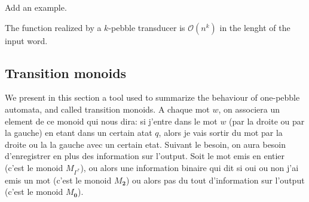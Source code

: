 \begin{example}
\begin{center}
Add an example.
\end{center}
\end{example}



\begin{proposition}
The function realized by a $k$-pebble transducer is $\mathcal{O}(n^k)$ in the lenght of the input word.
\end{proposition}

\subsection{Transition monoids}
We present in this section a tool used to summarize the behaviour of one-pebble automata, and called transition monoids. A chaque mot $w$, on associera un element de ce monoid qui nous dira: si j'entre dans le mot $w$ (par la droite ou par la gauche) en etant dans un certain atat $q$, alors je vais sortir du mot par la droite ou la  la gauche avec un certain etat. Suivant le besoin, on aura besoin d'enregistrer en plus des information sur l'output. Soit le mot emis en entier (c'est le monoid $M_{\Gamma^*}$), ou alors une information binaire qui dit si oui ou non j'ai emis un mot (c'est le monoid $M_{\mathbf{2}}$) ou alors pas du tout d'information sur l'output (c'est le monoid $M_{\mathbf{0}}$).

